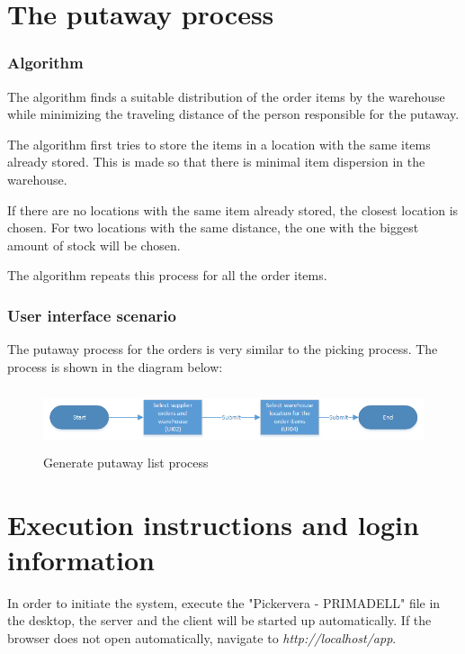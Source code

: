 \documentclass[a4paper]{article}
\begin{document}
\section{The putaway process}
\subsubsection{Algorithm}

The algorithm finds a suitable distribution of the order items by the warehouse while minimizing the traveling distance of the person responsible for the putaway.

The algorithm first tries to store the items in a location with the same items already stored. This is made so that there is minimal item dispersion in the warehouse.

If there are no locations with the same item already stored, the closest location is chosen. For two locations with the same distance, the one with the biggest amount of stock will be chosen.

The algorithm repeats this process for all the order items.

\subsubsection{User interface scenario}

The putaway process for the orders is very similar to the picking process. The process is shown in the diagram below:

\begin{figure}[h!]
\centerline{\includegraphics[height=1.8cm, width=16cm]{putawayDiagram.png}}
\caption{Generate putaway list process}
\end{figure}


\newpage

\section{Execution instructions and login information}
In order to initiate the system, execute the "Pickervera - PRIMADELL" file in the desktop, the server and the client will be started up automatically. If the browser does not open automatically, navigate to \textit{http://localhost/app}.
\end{document}
